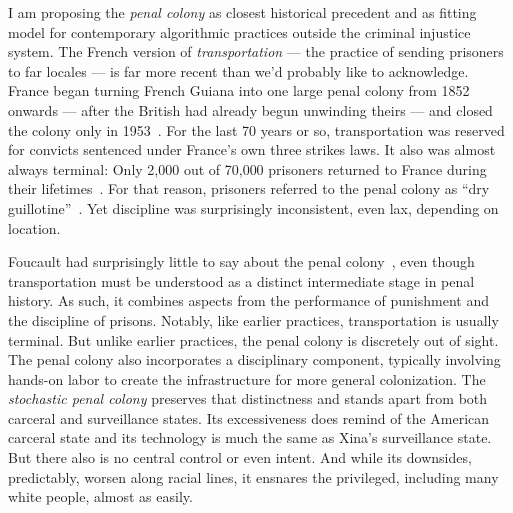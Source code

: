 I am proposing the \emph{penal colony} as closest historical precedent and as
fitting model for contemporary algorithmic practices outside the criminal
injustice system. The French version of \emph{transportation} --- the practice
of sending prisoners to far locales --- is far more recent than we'd probably
like to acknowledge. France began turning French Guiana into one large penal
colony from 1852 onwards --- after the British had already begun unwinding
theirs --- and closed the colony only in
1953~\cite{Aldrich2010,Anderson2018,Spierenburg2009}. For the last 70 years or
so, transportation was reserved for convicts sentenced under France's own three
strikes laws. It also was almost always terminal: Only 2,000 out of 70,000
prisoners returned to France during their
lifetimes~\cite{WallechinskyWallace1978}. For that reason, prisoners referred to
the penal colony as ``dry guillotine''~\cite{Furlong1913,ReneBelbenoit1938}. Yet
discipline was surprisingly inconsistent, even lax, depending on location.

Foucault had surprisingly little to say about the penal
colony~\cite{Redfield2005}, even though transportation must be understood as a
distinct intermediate stage in penal history. As such, it combines aspects from
the performance of punishment and the discipline of prisons. Notably, like
earlier practices, transportation is usually terminal. But unlike earlier
practices, the penal colony is discretely out of sight. The penal colony also
incorporates a disciplinary component, typically involving hands-on labor to
create the infrastructure for more general colonization. The \emph{stochastic
penal colony} preserves that distinctness and stands apart from both carceral
and surveillance states. Its excessiveness does remind of the American carceral
state and its technology is much the same as Xina's surveillance state. But
there also is no central control or even intent. And while its downsides,
predictably, worsen along racial lines, it ensnares the privileged, including
many white people, almost as easily.


